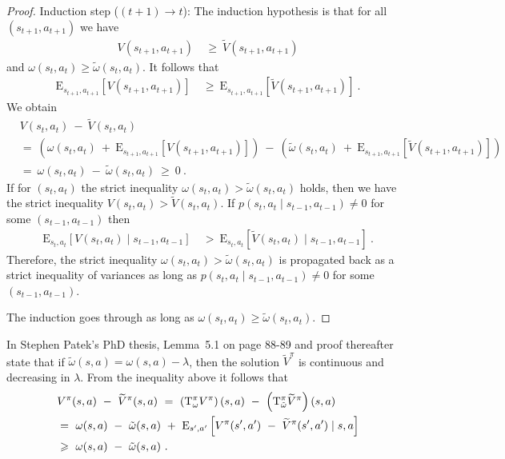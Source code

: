 \documentclass{article}
\newcommand\EXP{\mathbf{\mathrm{E}}}
\renewcommand{\geq}{\geqslant}
\begin{document}
\begin{appendices}
\begin{proof}
Induction step ($(t+1)\rightarrow t$):
The induction hypothesis is that for all $(s_{t+1},a_{t+1})$ we have
\begin{align}
  V(s_{t+1},a_{t+1})  \ &\geq \  \widetilde{V}(s_{t+1},a_{t+1})   
\end{align}
and  $\omega(s_t,a_t) \geq \tilde{\omega}(s_t,a_t)$.
It follows that
\begin{align}
 \EXP_{s_{t+1},a_{t+1}} \left[V(s_{t+1},a_{t+1})  \right]  \ &\geq \ 
 \EXP_{s_{t+1},a_{t+1}} \left[\widetilde{V}(s_{t+1},a_{t+1})  \right]  \ .
\end{align}
We obtain
\begin{align}
  & V(s_t,a_t)  \ - \  \widetilde{V}(s_t,a_t)   \\ \nonumber
  &= \ \left( \omega(s_t,a_t)
  \ + \ \EXP_{s_{t+1},a_{t+1}} \left[V(s_{t+1},a_{t+1})  \right] \right)  
  \ - \ \left( \tilde{\omega}(s_t,a_t)
  \ + \ \EXP_{s_{t+1},a_{t+1}} \left[\widetilde{V}(s_{t+1},a_{t+1})
  \right] \right)\\ \nonumber
  &= \ \omega(s_t,a_t) \ - \  \tilde{\omega}(s_t,a_t) \ \geq \ 0 \ .
\end{align}
If for $(s_t,a_t)$ the strict inequality 
$\omega(s_t,a_t) > \tilde{\omega}(s_t,a_t)$ 
holds, then we have the strict inequality
$V(s_t,a_t)  >  \widetilde{V}(s_t,a_t)$.
If $p(s_t,a_t \mid s_{t-1},a_{t-1}) \not=0$ for some  $(s_{t-1},a_{t-1})$ then
\begin{align}
 \EXP_{s_t,a_t} \left[V(s_t,a_t)  \mid s_{t-1},a_{t-1} \right]  \ &> \ 
 \EXP_{s_t,a_t} \left[\widetilde{V}(s_t,a_t)  \mid s_{t-1},a_{t-1} \right]  \ .
\end{align}
Therefore, the strict inequality 
$\omega(s_t,a_t) > \tilde{\omega}(s_t,a_t)$ 
is propagated back as a strict inequality of variances
as long as  $p(s_t,a_t \mid s_{t-1},a_{t-1}) \not=0$ for some  $(s_{t-1},a_{t-1})$.

The induction goes through as long as 
$\omega(s_t,a_t) \geq \tilde{\omega}(s_t,a_t)$.
\end{proof}


In Stephen Patek's PhD thesis, \cite{Patek:97} Lemma~5.1 on page 88-89 and proof
thereafter state that if  $\tilde{\omega}(s,a)=\omega(s,a)-\lambda$, then
the solution $\widetilde{V}^{\pi}$ is continuous and decreasing in $\lambda$.
From the inequality above it follows that
\begin{align}
  &V^{\pi}(s,a) \ - \  \widetilde{V}^{\pi}(s,a)
  \ = \ \left(\rT^\pi_{\omega} V^{\pi}\right) (s,a) \ - \
  \left(\rT^\pi_{\tilde{\omega}} \widetilde{V}^{\pi}\right) (s,a) \\
  \nonumber &= \
   \omega(s,a)  \ - \ \tilde{\omega}(s,a) \ + \ 
    \EXP_{s',a'}  \left[V^{\pi}(s',a') \ - \ \widetilde{V}^{\pi}(s',a')\mid s,a\right] \\
  \nonumber &\geq \
   \omega(s,a)  \ - \ \tilde{\omega}(s,a) \ .
\end{align}



\end{appendices}
\end{document}
